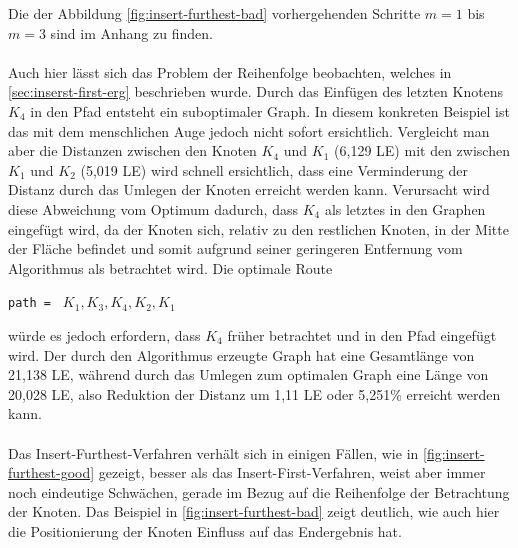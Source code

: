 Die der Abbildung \vref{fig:insert-furthest-bad} vorhergehenden Schritte $m=1$ bis $m=3$ sind im Anhang zu finden. 
\\\\
Auch hier lässt sich das Problem der Reihenfolge beobachten, welches in \vref{sec:inserst-first-erg} beschrieben wurde.
Durch das Einfügen des letzten Knotens $K_4$ in den Pfad entsteht ein suboptimaler Graph.
In diesem konkreten Beispiel ist das mit dem menschlichen Auge jedoch nicht sofort ersichtlich.
Vergleicht man aber die Distanzen zwischen den Knoten $K_4$ und $K_1$ (6,129 \ac{LE}) mit den zwischen $K_1$ und $K_2$ (5,019 \ac{LE}) wird schnell ersichtlich, dass eine Verminderung der Distanz durch das Umlegen der Knoten erreicht werden kann.
Verursacht wird diese Abweichung vom Optimum dadurch, dass $K_4$ als letztes in den Graphen eingefügt wird, da der Knoten sich, relativ zu den restlichen Knoten, in der Mitte der Fläche befindet und somit aufgrund seiner geringeren Entfernung vom Algorithmus als betrachtet wird.
Die optimale Route
\begin{addmargin}[1em]{2em}
    \lstinline{path = } $K_1, K_3, K_4, K_2, K_1$ 
    \end{addmargin}
 würde es jedoch erfordern, dass $K_4$ früher betrachtet und in den Pfad eingefügt wird.
Der durch den Algorithmus erzeugte Graph hat eine Gesamtlänge von 21,138 \ac{LE}, während durch das Umlegen zum optimalen Graph eine Länge von 20,028 \ac{LE}, also Reduktion der Distanz um 1,11 \ac{LE} oder 5,251\% erreicht werden kann.
\\\\
Das Insert-Furthest-Verfahren verhält sich in einigen Fällen, wie in \vref{fig:insert-furthest-good} gezeigt, besser als das Insert-First-Verfahren, weist aber immer noch eindeutige Schwächen, gerade im Bezug auf die Reihenfolge der Betrachtung der Knoten.
Das Beispiel in \vref{fig:insert-furthest-bad} zeigt deutlich, wie auch hier die Positionierung der Knoten Einfluss auf das Endergebnis hat.